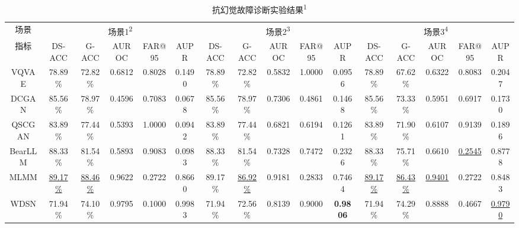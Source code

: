 \documentclass[UTF8,lettersize,journal]{IEEEtran}
\begin{document}
\setlength{\tabcolsep}{1.6pt}
\begin{table}[t!]
	\footnotesize
	\caption{抗幻觉故障诊断实验结果\textsuperscript{1}}
	\renewcommand{\arraystretch}{1.5}
	\centering
	\label{tab:comparison result1}       %
	\begin{tabular}{c|ccccc|ccccc|ccccc}
		\toprule[1pt]\noalign{\vspace{0.5pt}}
		场景&\multicolumn{5}{c|}{场景1\textsuperscript{2}}&\multicolumn{5}{c|}{场景2\textsuperscript{3}}&\multicolumn{5}{c}{场景3\textsuperscript{4}}
		\\\cmidrule(lr){2-6}\cmidrule(lr){7-11}\cmidrule(lr){12-16}
		指标&DS-ACC &G-ACC &AUROC &FAR@95 &AUPR &DS-ACC &G-ACC &AUROC &FAR@95 &AUPR &DS-ACC &G-ACC &AUROC &FAR@95 &AUPR \\\midrule[1pt]
		VQVAE & 78.89\% & 72.82\% & 0.6812  & 0.8028  & 0.1490  & 78.89\% & 72.82\% & 0.5832  & 1.0000  & 0.0956  & 78.89\% & 67.62\% & 0.6322  & 0.8083  & 0.2047  \\
		\noalign{\vspace{2.8pt}}\hline\noalign{\smallskip}
		DCGAN & 85.56\% & 78.97\% & 0.4596  & 0.7083  & 0.0678  & 85.56\% & 78.97\% & 0.7306  & 0.4861  & 0.1468  & 85.56\% & 73.33\% & 0.5951  & 0.6917  & 0.1730  \\
		\noalign{\vspace{2.8pt}}\hline\noalign{\smallskip}
		QSCGAN & 83.89\% & 77.44\% & 0.5393  & 1.0000  & 0.0942  & 83.89\% & 77.44\% & 0.6821  & 0.6194  & 0.1261  & 83.89\% & 71.90\% & 0.6107  & 0.9139  & 0.1896  \\
		\noalign{\vspace{2.8pt}}\hline\noalign{\smallskip}
		BearLLM & 88.33\% & 81.54\% & 0.5893  & 0.9083  & 0.0983  & 88.33\% & 81.54\% & 0.7328  & 0.7472  & 0.2326  & 88.33\% & 75.71\% & 0.6610  & \underline{0.2545}  & 0.8778  \\
		\noalign{\vspace{2.8pt}}\hline\noalign{\smallskip}
		MLMM  & \underline{89.17\%} & \underline{88.46\%} & 0.9622  & 0.2722  & 0.8660  & 89.17\% & \underline{86.92\%} & 0.9181  & 0.2833  & 0.7464  & \underline{89.17\%} & \underline{86.43\%} & \underline{0.9401}  & 0.2722  & 0.8483  \\
		\noalign{\vspace{2.8pt}}\hline\noalign{\smallskip}
		WDSN  & 71.94\% & 74.10\% & 0.9795  & 0.1000  & 0.9983  & 71.94\% & 72.56\% & 0.8139  & 0.9000  & \textbf{0.9806}  & 71.94\% & 74.29\% & 0.8888  & 0.4667  & \underline{0.9790}  \\

\end{tabular}
\end{table}
\end{document}
